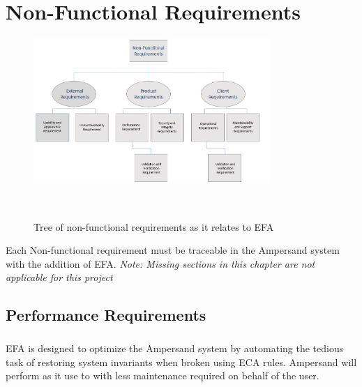 \documentclass[12pt]{report}
\begin{document}
\chapter{Non-Functional Requirements}\label{ch:NonFunc}
\begin{figure}[!htb]
	\centering
	\includegraphics[width=0.8\textwidth]{../figures/NONFUNCTIONAL}
	\caption{Tree of non-functional requirements as it relates to 
	EFA}~\label{fig:figure2} 
\end{figure}
    Each Non-functional requirement must be traceable in the Ampersand system 
    with the addition of EFA. 
    \textit{Note: Missing sections in this chapter are not applicable for this 
    project }    

\section{Performance Requirements}\label{sec:Performance}
\paragraph*{}
EFA is designed to optimize 
the Ampersand system by automating the tedious task 
of restoring system invariants when broken using ECA rules. 
Ampersand will 
perform as it use to with less maintenance required on behalf of the user.
\end{document}
